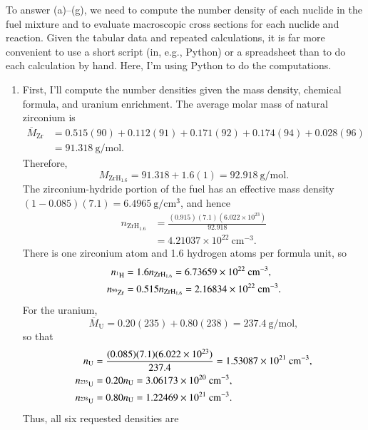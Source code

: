 \begin{draftsolution}
To answer (a)--(g), we need to compute the number density of each nuclide in
the fuel mixture and to evaluate macroscopic cross sections for each nuclide
and reaction.  Given the tabular data and repeated calculations, it is far
more convenient to use a short script (in, e.g., Python) or a spreadsheet than
to do each calculation by hand.  Here, I'm using Python to do the computations.

\begin{enumerate}[label=(\alph*)]
\item First, I'll compute the number densities given the mass density,
chemical formula, and uranium enrichment.  The average molar mass of natural
zirconium is
\[
\begin{split}
 \overline M_{\mathrm{Zr}}
 &=0.515(90)+0.112(91)+0.171(92)+0.174(94)+0.028(96)\\
 &=91.318~\mathrm{g/mol}.
\end{split}
\]
Therefore,
\[
 M_{\mathrm{ZrH}_{1.6}}=91.318+1.6(1)=92.918~\mathrm{g/mol}.
\]
The zirconium-hydride portion of the fuel has an effective mass density
$(1-0.085)(7.1)=6.4965~\mathrm{g/cm^3}$, and hence
\[
\begin{split}
 n_{\mathrm{ZrH}_{1.6}}
 &=\frac{(0.915)(7.1)(6.022\times10^{23})}{92.918}\\
 &=4.21037\times10^{22}~\mathrm{cm^{-3}}.
\end{split}
\]
There is one zirconium atom and 1.6 hydrogen atoms per formula unit, so
\[
\begin{split}
 n_{\isoA{H}{1}}&=1.6n_{\mathrm{ZrH}_{1.6}}
 =6.73659\times10^{22}~\mathrm{cm^{-3}},\\
 n_{\isoA{Zr}{90}}&=0.515n_{\mathrm{ZrH}_{1.6}}
 =2.16834\times10^{22}~\mathrm{cm^{-3}}.
\end{split}
\]
For the uranium,
\[
 \overline M_{\mathrm U}=0.20(235)+0.80(238)=237.4~\mathrm{g/mol},
\]
so that
\[
\begin{split}
 n_{\mathrm U}
 &=\frac{(0.085)(7.1)(6.022\times10^{23})}{237.4}
 =1.53087\times10^{21}~\mathrm{cm^{-3}},\\
 n_{\isoA{U}{235}}&=0.20n_{\mathrm U}
 =3.06173\times10^{20}~\mathrm{cm^{-3}},\\
 n_{\isoA{U}{238}}&=0.80n_{\mathrm U}
 =1.22469\times10^{21}~\mathrm{cm^{-3}}.
\end{split}
\]
Thus, all six requested densities are
\begin{center}
\begin{tabular}{|l|r|r|}

\end{tabular}
\end{center}
\end{enumerate}
\end{draftsolution}
